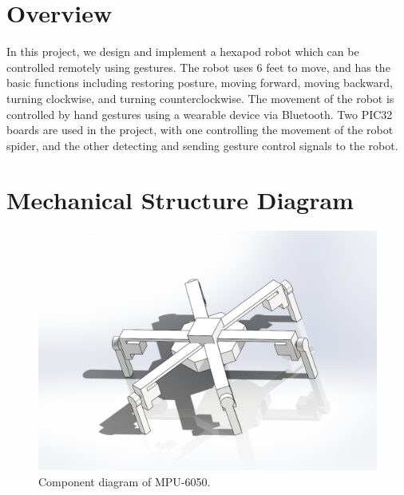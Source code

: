 \documentclass[a4paper]{article}
\begin{document}
\section{Overview}
In this project, we design and implement a hexapod robot which can be controlled remotely using gestures. The robot uses 6 feet to move, and has the basic functions including restoring posture, moving forward, moving backward, turning clockwise, and turning counterclockwise. The movement of the robot is controlled by hand gestures using a wearable device via Bluetooth. Two PIC32 boards are used in the project, with one controlling the movement of the robot spider, and the other detecting and sending gesture control signals to the robot.
\section{Mechanical Structure Diagram}
\begin{figure}[H]
    \centering
    \includegraphics[width=1\textwidth]{Mechanical_Structure_2D.pdf}
    \caption{Component diagram of MPU-6050.}
\end{figure}
\end{document}
